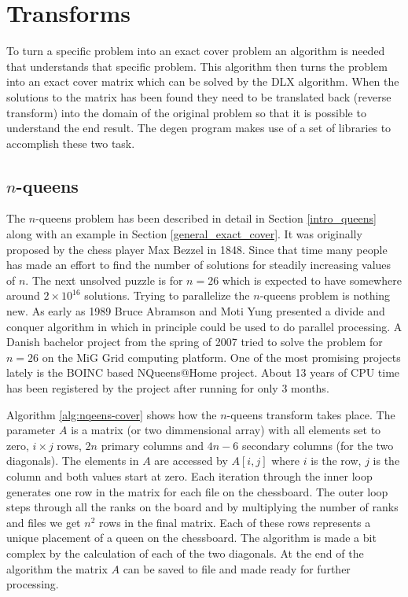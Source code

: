 


\section{Transforms}
\label{transforms}

To turn a specific problem into an exact cover problem an algorithm is needed that understands that specific problem.
This algorithm then turns the problem into an exact cover matrix which can be solved by the DLX algorithm.
When the solutions to the matrix has been found they need to be translated back (reverse transform) into the domain of the original problem so that it is possible to understand the end result.
The degen program makes use of a set of libraries to accomplish these two task.


\subsection{\texorpdfstring{$n$}{n}-queens}
\label{queens_trans}

The $n$-queens problem has been described in detail in Section \ref{intro_queens} along with an example in Section \ref{general_exact_cover}.
It was originally proposed by the chess player Max Bezzel in 1848.
Since that time many people has made an effort to find the number of solutions for steadily increasing values of $n$.
The next unsolved puzzle is for $n = 26$ which is expected to have somewhere around $2 \times 10^{16}$ solutions.
Trying to parallelize the $n$-queens problem is nothing new.
As early as 1989 Bruce Abramson and Moti Yung presented a divide and conquer algorithm in \cite{Abramson89} which in principle could be used to do parallel processing.
A Danish bachelor project from the spring of 2007 \cite{queens-mig} tried to solve the problem for $n=26$ on the MiG \cite{mig} Grid computing platform.
One of the most promising projects lately is the BOINC based NQueens@Home \cite{nqueensathome} project.
About 13 years of CPU time has been registered by the project after running for only 3 months.

Algorithm \ref{alg:nqeens-cover} shows how the $n$-queens transform takes place.
The parameter $A$ is a matrix (or two dimmensional array) with all elements set to zero, $i \times j$ rows, $2n$ primary columns and $4n - 6$ secondary columns (for the two diagonals).
The elements in $A$ are accessed by $A[i,j]$ where $i$ is the row, $j$ is the column and both values start at zero.
Each iteration through the inner loop generates one row in the matrix for each file on the chessboard.
The outer loop steps through all the ranks on the board and by multiplying the number of ranks and files we get $n^2$ rows in the final matrix.
Each of these rows represents a unique placement of a queen on the chessboard.
The algorithm is made a bit complex by the calculation of each of the two diagonals.
At the end of the algorithm the matrix $A$ can be saved to file and made ready for further processing.

